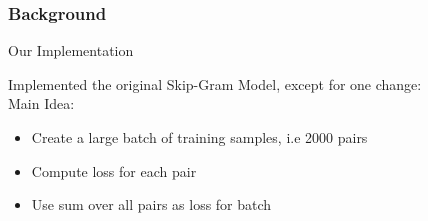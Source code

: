 \begin{frame}
\frametitle{Background}
\begin{Large}
Our Implementation \\
\end{Large}
Implemented the original Skip-Gram Model, except for one change:\\
Main Idea: 
\begin{itemize}
\item Create a large batch of training samples, i.e 2000 pairs
\item Compute loss for each pair
\item Use sum over all pairs as loss for batch 
\end{itemize}
\end{frame}
